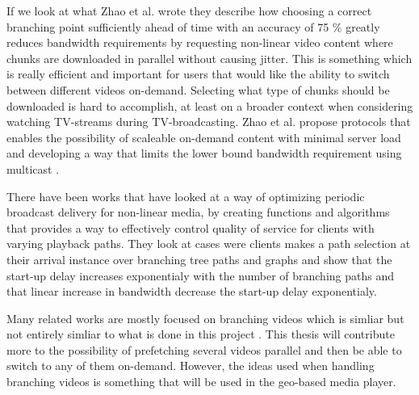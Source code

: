 If we look at what Zhao et al. \cite{scalableOnDemand} wrote they describe how choosing a correct branching point sufficiently ahead of time with an accuracy of 75 \% greatly reduces bandwidth requirements by requesting non-linear video content where chunks are downloaded in parallel without causing jitter. This is something which is really efficient and important for users that would like the ability to switch between different videos on-demand. Selecting what type of chunks should be downloaded is hard to accomplish, at least on a broader context when considering watching TV-streams during TV-broadcasting. Zhao et al. \cite{scalableOnDemand} propose protocols that enables the possibility of scaleable on-demand content with minimal server load and developing a way that limits the lower bound bandwidth requirement using multicast \cite{scalableOnDemand}. 


There have been works that have looked at a way of optimizing periodic broadcast delivery for non-linear media, by creating functions and algorithms that provides a way to effectively control quality of service for clients with varying playback paths. They look at cases were clients makes a path selection at their arrival instance over branching tree paths and graphs and show that the start-up delay increases exponentialy with the number of branching paths and that linear increase in bandwidth decrease the start-up delay exponentialy\cite{optimizedbroadcast}.

Many related works are mostly focused on branching videos which is simliar but not entirely simliar to what is done in this project \cite{qualbranch, hasmultipath,scalableOnDemand}. This thesis will contribute more to the possibility of prefetching several videos parallel and then be able to switch to any of them on-demand. However, the ideas used when handling branching videos is something that will be used in the geo-based media player.

